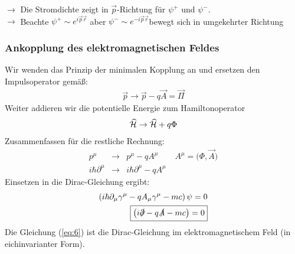 $\longrightarrow$ Die Stromdichte zeigt in $\vec p$-Richtung für $\psi^+$ und $\psi^-$.\\
$\longrightarrow$ Beachte $\psi^+\sim e^{i\vec p\vec r}$ aber $\psi^- \sim e^{-i\vec p\vec r}$bewegt sich in umgekehrter Richtung

\subsubsection{Ankopplung des elektromagnetischen Feldes}
Wir wenden das Prinzip der minimalen Kopplung an und ersetzen den Impulsoperator gemäß:
\begin{eqnarray*}
\vec p \rightarrow \vec p - q \vec A = \vec \Pi
\end{eqnarray*}
Weiter addieren wir die potentielle Energie zum Hamiltonoperator
\begin{eqnarray*} \widehat {\mathcal H} \rightarrow \widehat {\mathcal H} + q \Phi\end{eqnarray*}
Zusammenfassen für die restliche Rechnung:
\begin{eqnarray*}
p^\mu &\rightarrow& p^\mu - q A^\mu \qquad A^\mu = \Big ( \Phi , \vec A \Big)\\
i\hbar \partial ^\mu &\rightarrow& i \hbar \partial^\mu - q A^\mu
\end{eqnarray*}
Einsetzen in die Dirac-Gleichung ergibt:
\begin{eqnarray*}\nonumber
\left(i\hbar \partial _ \mu \gamma^\mu - q A_\mu\gamma^\mu - m c\right) \psi = 0\\\label{eq:6}
\boxed{\left(i\slashed \partial - q \slashed A - m c\right) = 0}
\end{eqnarray*}
Die Gleichung (\ref{eq:6}) ist die Dirac-Gleichung im elektromagnetischem Feld (in eichinvarianter Form). 


